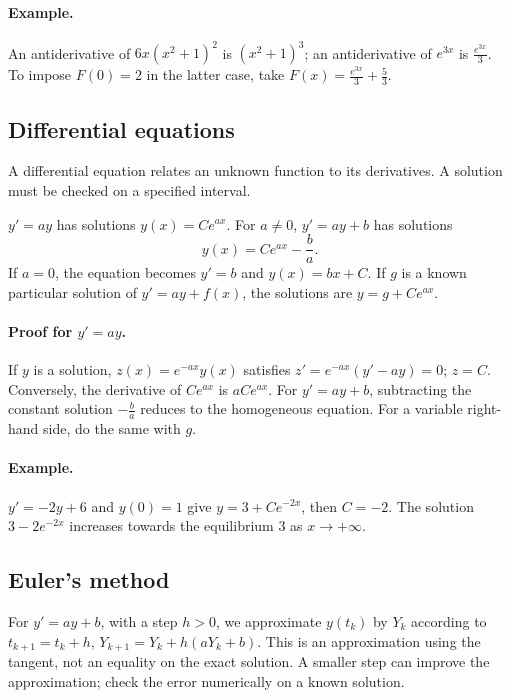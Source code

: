 \paragraph{Example.} An antiderivative of $6x(x^2+1)^2$ is $(x^2+1)^3$; an antiderivative of $e^{3x}$ is $\frac{e^{3x}}{3}$. To impose $F(0)=2$ in the latter case, take $F(x)=\frac{e^{3x}}{3}+\frac{5}{3}$.
\subsection{Differential equations}
A differential equation relates an unknown function to its derivatives. A solution must be checked on a specified interval.
\begin{keypoint}
$y'=ay$ has solutions $y(x)=Ce^{ax}$. For $a\ne0$, $y'=ay+b$ has solutions
\[y(x)=Ce^{ax}-\frac ba.\]
If $a=0$, the equation becomes $y'=b$ and $y(x)=bx+C$.
If $g$ is a known particular solution of $y'=ay+f(x)$, the solutions are $y=g+Ce^{ax}$.
\end{keypoint}
\paragraph{Proof for $y'=ay$.} If $y$ is a solution, $z(x)=e^{-ax}y(x)$ satisfies $z'=e^{-ax}(y'-ay)=0$; $z=C$. Conversely, the derivative of $Ce^{ax}$ is $aCe^{ax}$. For $y'=ay+b$, subtracting the constant solution $-\frac{b}{a}$ reduces to the homogeneous equation. For a variable right-hand side, do the same with $g$.
\paragraph{Example.} $y'=-2y+6$ and $y(0)=1$ give $y=3+Ce^{-2x}$, then $C=-2$. The solution $3-2e^{-2x}$ increases towards the equilibrium $3$ as $x\to+\infty$.
\subsection{Euler's method}
For $y'=ay+b$, with a step $h>0$, we approximate $y(t_k)$ by $Y_k$ according to $t_{k+1}=t_k+h$, $Y_{k+1}=Y_k+h(aY_k+b)$. This is an approximation using the tangent, not an equality on the exact solution. A smaller step can improve the approximation; check the error numerically on a known solution.


\mxnewpage
